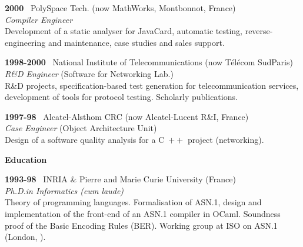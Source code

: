 \documentclass[a4paper,11pt]{article}
\newcommand{\cpp}{\mbox{C \hspace*{-2.5mm} \raise 0.7mm \hbox{${\scriptscriptstyle ++}$}}}
\begin{document}
\bigskip

\noindent\textbf{2000} \ \textsf{PolySpace Tech.\@} (now MathWorks,
Montbonnot, France)\\ \emph{Compiler Engineer}\\ Development of a static
analyser for JavaCard, automatic testing, reverse\hyp{}engineering and
maintenance, case studies and sales support.

\bigskip

\noindent\textbf{1998-2000} \ \textsf{National Institute of
  Telecommunications} (now T\'el\'ecom SudParis)\\ \emph{R\&D
  Engineer} (Software for Networking Lab.)\\ R\&D projects,
specification-based test generation for telecommunication services,
development of tools for protocol testing. Scholarly publications.

\bigskip

\noindent\textbf{1997-98} \ \textsf{Alcatel-Alsthom CRC} (now
Alcatel-Lucent R\&I, France)\\ \emph{Case Engineer} (Object
Architecture Unit)\\ Design of a software quality analysis for a
\cpp{} project (networking).

\bigskip
\noindent\textbf{\large Education}
\bigskip

\noindent\textbf{1993-98} \ \textsf{INRIA \& Pierre and Marie Curie
  University} (France)\\ \emph{Ph.D.\@ in Informatics (cum
laude)}\\ Theory of programming languages. Formalisation of ASN.1,
design and implementation of the front-end of an ASN.1 compiler in
OCaml. Soundness proof of the Basic Encoding Rules (BER). Working
group at ISO on ASN.1 (London, ).




\end{document}
